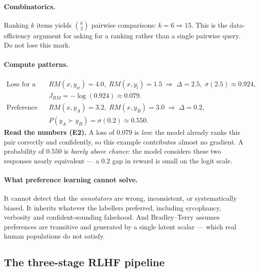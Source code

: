 \documentclass[11pt,a4paper]{article}
\begin{document}
\paragraph{Combinatorics.} Ranking $k$ items yields $\binom{k}{2}$ pairwise
comparisons: $k=6\Rightarrow 15$. This is the data-efficiency argument for
asking for a ranking rather than a single pairwise query. Do not lose this mark.

\paragraph{Compute patterns.}
\begin{align*}
\text{Loss for a pair: } & RM(x,y_w)=4.0,\;RM(x,y_l)=1.5
\;\Rightarrow\; \Delta=2.5,\;\sigma(2.5)\approx0.924,\\
&J_{RM}=-\log(0.924)\approx \mathbf{0.079}.\\
\text{Preference probability: } & RM(x,y_A)=3.2,\;RM(x,y_B)=3.0
\;\Rightarrow\; \Delta=0.2,\\
& P(y_A\succ y_B)=\sigma(0.2)\approx \mathbf{0.550}.
\end{align*}
\textbf{Read the numbers (E2).} A loss of $0.079$ is \emph{low}: the model
already ranks this pair correctly and confidently, so this example contributes
almost no gradient. A probability of $0.550$ is \emph{barely above chance}:
the model considers these two responses nearly equivalent --- a $0.2$ gap in
reward is small on the logit scale.

\paragraph{What preference learning cannot solve.} It cannot detect that the
\emph{annotators} are wrong, inconsistent, or systematically biased. It
inherits whatever the labellers preferred, including sycophancy, verbosity and
confident-sounding falsehood. And Bradley--Terry assumes preferences are
transitive and generated by a single latent scalar --- which real human
populations do not satisfy.

\subsection{The three-stage RLHF pipeline}
\end{document}
